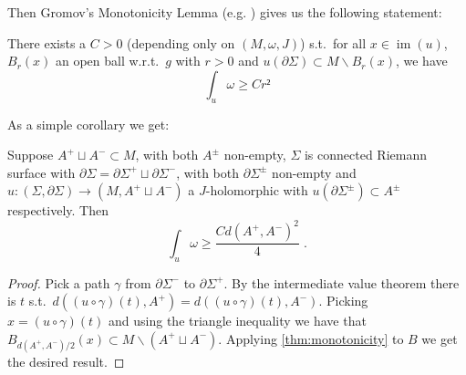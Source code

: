 \documentclass[12pt,a4paper,draft]{scrartcl}
\DeclareMathOperator{\im}{im}
\begin{document}
Then Gromov's Monotonicity Lemma (e.g. \cite[Proposition 4.3.1 (ii)]{sikorav1994}) gives us the following statement:

\begin{lemma}[Monotonicity]
  \label{thm:monotonicity}
  There exists a $C>0$ (depending only on $(M,ω,J)$) s.t.\ for all $x ∈ \im(u)$, $B_r(x)$ an open ball w.r.t.\ $g$ with $r > 0$ and $u(∂Σ) ⊂ M ∖ B_r(x)$, we have
  \[∫_u ω ≥ C r²\]
\end{lemma}

As a simple corollary we get:

\begin{corollary}
  \label{thm:small_buffer}
  Suppose $A^+ ⊔ A^- ⊂ M$, with both $A^±$ non-empty, $Σ$ is connected Riemann surface with $∂Σ = ∂Σ^+ ⊔ ∂Σ^-$, with both $∂Σ^±$ non-empty and $u\colon (Σ,∂Σ) → (M,A^+ ⊔ A^-)$ a $J$-holomorphic with $u(∂Σ^±) ⊂ A^±$ respectively.
  Then
  \[∫_u ω ≥ \frac{C d(A^+,A^-)^2}{4} \; .\]
\end{corollary}

\begin{proof}
  Pick a path $γ$ from $∂Σ^-$ to $∂Σ^+$. By the intermediate value theorem there is $t$ s.t.\ $d((u ∘ γ) (t),A^+) = d((u ∘ γ)(t), A^-)$. Picking $x = (u ∘ γ)(t)$ and using the triangle inequality we have that $B_{d(A^+,A^-)/2}(x) ⊂ M ∖ ( A^+ ⊔ A^-) $. Applying \cref{thm:monotonicity} to $B$ we get the desired result.
\end{proof}
\end{document}
